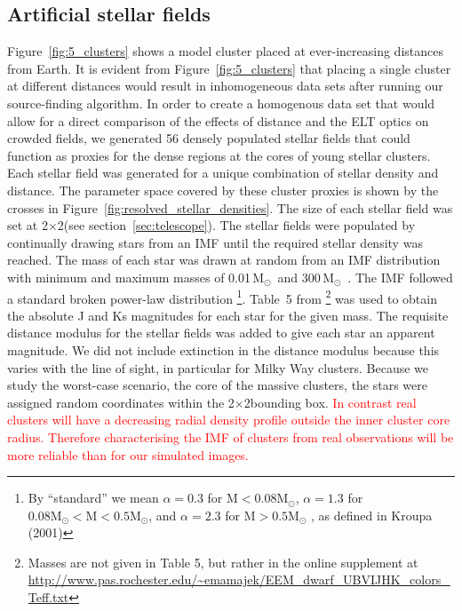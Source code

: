 \documentclass[referee]{aa}
\newcommand{\msun}{M$_\odot$~}
\newcommand{\langedit}[1]{\textcolor{red}{#1}}
\begin{document}
\subsection{Artificial stellar fields}
  \label{subsec:stellar_fields}
Figure~\ref{fig:5_clusters} shows a model cluster placed at ever-increasing distances from Earth.
It is evident from Figure~\ref{fig:5_clusters} that placing a single cluster at different distances would result in inhomogeneous data sets after running our source-finding algorithm.
In order to create a homogenous data set that would allow for a direct comparison of the effects of distance and the ELT optics on crowded fields, we generated 56 densely populated stellar fields that could function as proxies for the dense regions at the cores of young stellar clusters.
Each stellar field was generated for a unique combination of stellar density and distance.
The parameter space covered by these cluster proxies is shown by the crosses in Figure~\ref{fig:resolved_stellar_densities}.
The size of each stellar field was set at 2\arcsec$\times$2\arcsec (see section~\ref{sec:telescope}).
The stellar fields were populated by continually drawing stars from an IMF until the required stellar density was reached.
The mass of each star was drawn at random from an IMF distribution with minimum and maximum masses of 0.01\,\msun and 300\,\msun.
The IMF followed a standard \citet{kroupa2001} broken power-law distribution
\footnote{By ``standard'' we mean $\alpha=0.3$ for $\mathrm{M} < 0.08 \mathrm{M}_\odot$, $\alpha=1.3$ for $0.08\mathrm{M}_\odot < \mathrm{M} < 0.5 \mathrm{M}_\odot$, and $\alpha=2.3$ for $\mathrm{M} > 0.5 \mathrm{M}_\odot$ , as defined in Kroupa (2001)}.
Table~5 from \citet{pecaut2013}\footnote{Masses are not given in Table 5, but rather in the online supplement at \url{http://www.pas.rochester.edu/~emamajek/EEM_dwarf_UBVIJHK_colors_Teff.txt}}
was used to obtain the absolute J and Ks magnitudes for each star for the given mass.
The requisite distance modulus for the stellar fields was added to give each star an apparent magnitude.
We did not include extinction in the distance modulus because this varies with the line of sight, in particular for Milky Way clusters.
Because we study the worst-case scenario, the core of the massive clusters, the stars were assigned random coordinates within the 2\arcsec$\times$2\arcsec bounding box.
\langedit{In contrast real clusters will have a decreasing radial density profile outside the inner cluster core radius.
Therefore characterising the IMF of clusters from real observations will be more reliable than for our simulated images.}
\end{document}
